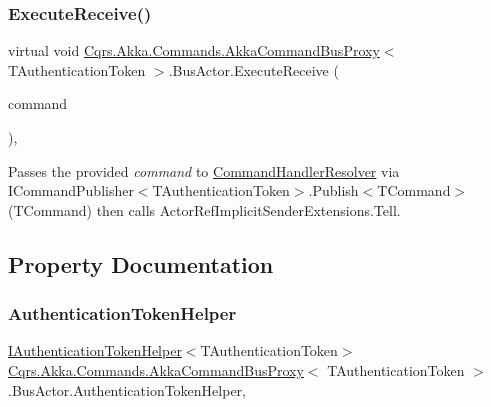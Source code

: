 \subsubsection{\texorpdfstring{Execute\+Receive()}{ExecuteReceive()}}
{\footnotesize\ttfamily virtual void \hyperlink{classCqrs_1_1Akka_1_1Commands_1_1AkkaCommandBusProxy}{Cqrs.\+Akka.\+Commands.\+Akka\+Command\+Bus\+Proxy}$<$ T\+Authentication\+Token $>$.Bus\+Actor.\+Execute\+Receive (\begin{DoxyParamCaption}\item[{\hyperlink{interfaceCqrs_1_1Commands_1_1ICommand}{I\+Command}$<$ T\+Authentication\+Token $>$}]{command }\end{DoxyParamCaption})\hspace{0.3cm}{\ttfamily [protected]}, {\ttfamily [virtual]}}



Passes the provided {\itshape command}  to \hyperlink{classCqrs_1_1Akka_1_1Commands_1_1AkkaCommandBusProxy_1_1BusActor_a097e43f25d55e632c2c5da9d0255d180_a097e43f25d55e632c2c5da9d0255d180}{Command\+Handler\+Resolver} via I\+Command\+Publisher$<$\+T\+Authentication\+Token$>$.\+Publish$<$\+T\+Command$>$(\+T\+Command) then calls Actor\+Ref\+Implicit\+Sender\+Extensions.\+Tell. 



\subsection{Property Documentation}
\mbox{\label{classCqrs_1_1Akka_1_1Commands_1_1AkkaCommandBusProxy_1_1BusActor_a10dd32ee768f6ccf93aa0e04472c84b6_a10dd32ee768f6ccf93aa0e04472c84b6}} 
\subsubsection{\texorpdfstring{Authentication\+Token\+Helper}{AuthenticationTokenHelper}}
{\footnotesize\ttfamily \hyperlink{interfaceCqrs_1_1Authentication_1_1IAuthenticationTokenHelper}{I\+Authentication\+Token\+Helper}$<$T\+Authentication\+Token$>$ \hyperlink{classCqrs_1_1Akka_1_1Commands_1_1AkkaCommandBusProxy}{Cqrs.\+Akka.\+Commands.\+Akka\+Command\+Bus\+Proxy}$<$ T\+Authentication\+Token $>$.Bus\+Actor.\+Authentication\+Token\+Helper\hspace{0.3cm}{\ttfamily [get]}, {\ttfamily [protected]}}



